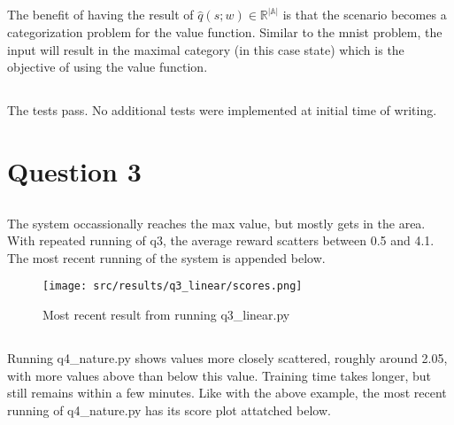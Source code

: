 \documentclass{article}
\begin{document}
\subsection{}
The benefit of having the result of $\hat{q}(s;w)\in \mathbb{R}^{|\mathbb{A}|}$
is that the scenario becomes a categorization problem for the value function. 
Similar to the mnist problem, the input will result in the maximal category (in
this case state) which is the objective of using the value function.

\subsection{}
The tests pass. No additional tests were implemented at initial time of writing.

\subsection{}

\subsection{}

\section{Question 3}
\subsection{}
The system occassionally reaches the max value, but mostly gets in the area. 
With repeated running of q3, the average reward scatters between 0.5 and 4.1.
The most recent running of the system is appended below.
\begin{figure}[h!]
	\centering
	\texttt{[image: src/results/q3\_linear/scores.png]}
	\caption{Most recent result from running q3\_linear.py}
\end{figure}

\subsection{}
Running q4\_nature.py shows values more closely scattered, roughly around 2.05,
with more values above than below this value.
Training time takes longer, but still remains within a few minutes.
Like with the above example, the most recent running of q4\_nature.py has its 
score plot attatched below.
\end{document}
